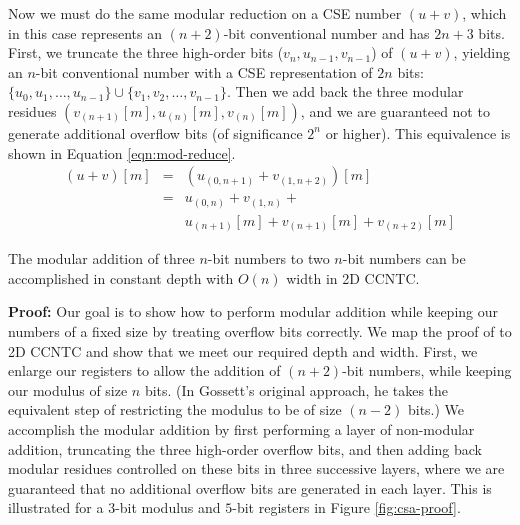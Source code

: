 \documentclass[twoside]{article}
\begin{document}
Now we must do the same modular reduction on a CSE number $(u+v)$,
which in this case represents an $(n+2)$-bit conventional number and has
$2n+3$ bits.
%
%
First, we truncate the three high-order bits ($v_{n}, u_{n-1}, v_{n-1}$)
of $(u+v)$, yielding an $n$-bit
conventional number with a CSE representation of $2n$ bits:
$\{u_0, u_1, \ldots, u_{n-1}\} \cup \{v_1, v_2, \ldots, v_{n-1}\}$.
Then we add back the three modular residues
$(v_{(n+1)}[m], u_{(n)}[m], v_{(n)}[m])$, and we are guaranteed not to
generate additional overflow bits (of significance $2^{n}$ or higher). This equivalence
is shown in Equation \ref{eqn:mod-reduce}.
\begin{eqnarray}
(u+v)[m] &=& \left(u_{(0,n+1)} + v_{(1,n+2)}\right)[m] \nonumber \\
 &=& u_{(0,n)} +
     v_{(1,n)} + \nonumber \\
 & & u_{(n+1)}[m] +
     v_{(n+1)}[m] + v_{(n+2)}[m]
\label{eqn:mod-reduce}
\end{eqnarray}

\begin{lemma}
The modular addition of three $n$-bit numbers to two $n$-bit numbers can be
accomplished
in constant depth with $O(n)$ width in \textsc{2D CCNTC}.
\end{lemma}

\vspace*{12pt}
\noindent
{\bf Proof:}
Our goal is to show how to perform modular addition while keeping our numbers
of a fixed size by treating overflow bits correctly.
We map the proof of \cite{Gossett1998} to \textsc{2D CCNTC} and show that
we meet our required depth and width.
First, we enlarge our registers to allow the addition of $(n+2)$-bit numbers,
while keeping our modulus of size $n$ bits.
(In Gossett's original approach, he takes the equivalent step of restricting
the modulus to be of size $(n-2)$ bits.) We accomplish the modular addition
by first performing a layer of non-modular addition, truncating the three high-order
overflow bits, and then adding back modular residues controlled on these
bits in three successive layers, where we are guaranteed that no additional
overflow bits are generated in each layer.
This is illustrated for a $3$-bit modulus and $5$-bit registers
in Figure \ref{fig:csa-proof}.
\end{document}
